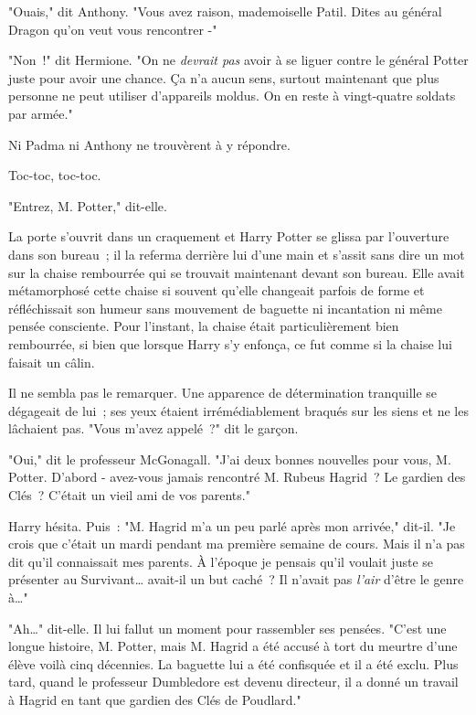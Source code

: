 "Ouais," dit Anthony. "Vous avez raison, mademoiselle Patil. Dites au général Dragon qu'on veut vous rencontrer -"

"Non~!" dit Hermione. "On ne \emph{devrait pas} avoir à se liguer contre le général Potter juste pour avoir une chance. Ça n'a aucun sens, surtout maintenant que plus personne ne peut utiliser d'appareils moldus. On en reste à vingt-quatre soldats par armée."

Ni Padma ni Anthony ne trouvèrent à y répondre.

\later

Toc-toc, toc-toc.

"Entrez, M. Potter," dit-elle.

La porte s'ouvrit dans un craquement et Harry Potter se glissa par l'ouverture dans son bureau~; il la referma derrière lui d'une main et s'assit sans dire un mot sur la chaise rembourrée qui se trouvait maintenant devant son bureau. Elle avait métamorphosé cette chaise si souvent qu'elle changeait parfois de forme et réfléchissait son humeur sans mouvement de baguette ni incantation ni même pensée consciente. Pour l'instant, la chaise était particulièrement bien rembourrée, si bien que lorsque Harry s'y enfonça, ce fut comme si la chaise lui faisait un câlin.

Il ne sembla pas le remarquer. Une apparence de détermination tranquille se dégageait de lui~; ses yeux étaient irrémédiablement braqués sur les siens et ne les lâchaient pas. "Vous m'avez appelé~?" dit le garçon.

"Oui," dit le professeur McGonagall. "J'ai deux bonnes nouvelles pour vous, M. Potter. D'abord - avez-vous jamais rencontré M. Rubeus Hagrid~? Le gardien des Clés~? C'était un vieil ami de vos parents."

Harry hésita. Puis~: "M. Hagrid m'a un peu parlé après mon arrivée," dit-il. "Je crois que c'était un mardi pendant ma première semaine de cours. Mais il n'a pas dit qu'il connaissait mes parents. À l'époque je pensais qu'il voulait juste se présenter au Survivant… avait-il un but caché~? Il n'avait pas \emph{l'air} d'être le genre à…"

"Ah…" dit-elle. Il lui fallut un moment pour rassembler ses pensées. "C'est une longue histoire, M. Potter, mais M. Hagrid a été accusé à tort du meurtre d'une élève voilà cinq décennies. La baguette lui a été confisquée et il a été exclu. Plus tard, quand le professeur Dumbledore est devenu directeur, il a donné un travail à Hagrid en tant que gardien des Clés de Poudlard."

